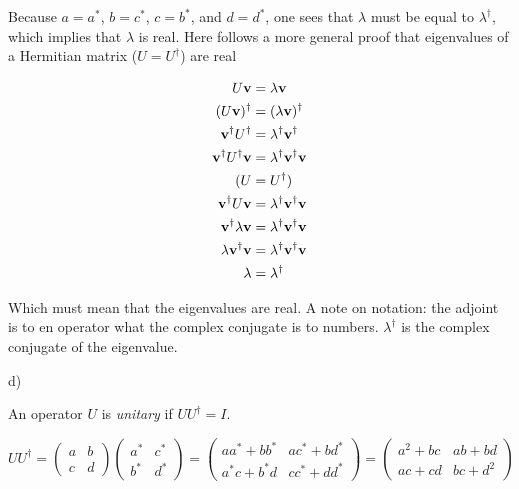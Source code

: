\documentclass{article}
\begin{document}
Because $a=a^*$, $b=c^*$, $c=b^*$, and $d=d^*$, one sees that $\lambda$ must be equal to $\lambda^{\dagger}$, which implies that $\lambda$ is real. Here follows a more general proof that eigenvalues of a Hermitian matrix ($U=U^{\dagger}$) are real

\begin{align*}
U\vb{v} &= \lambda\vb{v} \\
(U\vb{v})^{\dagger} &= (\lambda\vb{v})^{\dagger} \\
\vb{v}^{\dagger} U^{\dagger} &= \lambda^{\dagger} \vb{v}^{\dagger} \\
\vb{v}^{\dagger} U^{\dagger} \vb{v} &= \lambda^{\dagger} \vb{v}^{\dagger} \vb{v} \\
(U&=U^{\dagger}) \\
\vb{v}^{\dagger} U \vb{v} &= \lambda^{\dagger} \vb{v}^{\dagger} \vb{v} \\
\vb{v}^{\dagger} \lambda \vb{v} &= \lambda^{\dagger} \vb{v}^{\dagger} \vb{v} \\
\lambda \vb{v}^{\dagger} \vb{v} &= \lambda^{\dagger} \vb{v}^{\dagger} \vb{v} \\
\lambda &= \lambda^{\dagger}
\end{align*}

Which must mean that the eigenvalues are real. A note on notation: the adjoint is to en operator what the complex conjugate is to numbers. $\lambda^{\dagger}$ is the complex conjugate of the eigenvalue.

\vspace{1cm}

d)

\vspace{0.5cm}

An operator $U$ is \emph{unitary} if $UU^{\dagger}=I$.

\begin{equation*}
UU^{\dagger}= 
\begin{pmatrix} a &  b \\  c & d \end{pmatrix} 
\begin{pmatrix} a^* & c^* \\ b^* & d^*\end{pmatrix}
= \begin{pmatrix} 
aa^*+bb^* & ac^* +bd^* \\
a^*c + b^*d & cc^* + dd^*
\end{pmatrix} 
= \begin{pmatrix} 
a^2+bc & ab + bd \\
ac + cd & bc + d^2
\end{pmatrix} 
\end{equation*}
\end{document}
